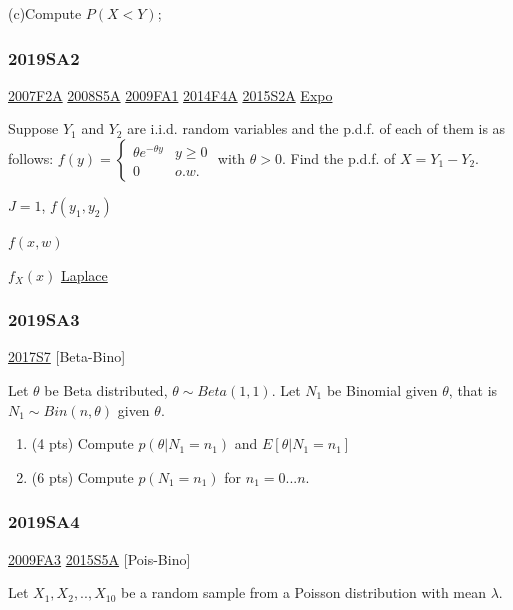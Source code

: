 \documentclass[10pt,twocolumn,portrait]{article}
\begin{document}
(c)Compute \(P(X<Y)\);

\hypertarget{sa2-3}{%
\subsubsection{2019SA2}\label{sa2-3}}

\protect\hyperlink{f2a}{2007F2A} \protect\hyperlink{s5a}{2008S5A}
\protect\hyperlink{fa1}{2009FA1} \protect\hyperlink{f4a-1}{2014F4A}
\protect\hyperlink{s2a-1}{2015S2A} \protect\hyperlink{Expo}{Expo}

Suppose \(Y_1\) and \(Y_2\) are i.i.d. random variables and the p.d.f.
of each of them is as follows:
\(f(y)=\begin{cases}\theta e^{-\theta y}& y\ge0\\0& o.w.\end{cases}\)
with \(\theta>0\). Find the p.d.f. of \(X=Y_1-Y_2\).

\(J=1\), \(f(y_1,y_2)\)

\(f(x,w)\)

\(f_X(x)\) \protect\hyperlink{Laplace}{Laplace}

\hypertarget{sa3-3}{%
\subsubsection{2019SA3}\label{sa3-3}}

\protect\hyperlink{s7-3}{2017S7} {[}Beta-Bino{]}

Let \(\theta\) be Beta distributed, \(\theta\sim Beta(1,1)\). Let
\(N_1\) be Binomial given \(\theta\), that is \(N_1\sim Bin(n,\theta)\)
given \(\theta\).

\begin{enumerate}
\def\labelenumi{(\alph{enumi})}
\item
  (4 pts) Compute \(p(\theta|N_1=n_1)\) and \(E[\theta|N_1=n_1]\)
\item
  (6 pts) Compute \(p(N_1=n_1)\) for \(n_1=0...n\).
\end{enumerate}

\hypertarget{sa4-3}{%
\subsubsection{2019SA4}\label{sa4-3}}

\protect\hyperlink{fa3}{2009FA3} \protect\hyperlink{s5a-1}{2015S5A}
{[}Pois-Bino{]}

Let \(X_1,X_2,..,X_{10}\) be a random sample from a Poisson distribution
with mean \(\lambda\).
\end{document}
